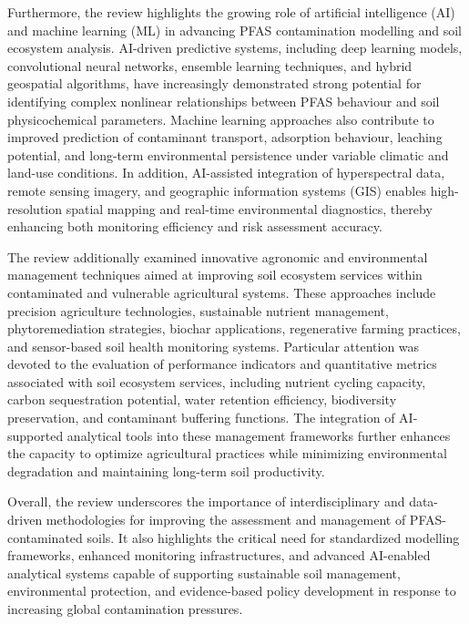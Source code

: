 \documentclass[preprint,12pt]{elsarticle}            %
\begin{document}
Furthermore, the review highlights the growing role of artificial intelligence
(AI) and machine learning (ML) in advancing PFAS contamination modelling and
soil ecosystem analysis. AI-driven predictive systems, including deep learning
models, convolutional neural networks, ensemble learning techniques, and hybrid
geospatial algorithms, have increasingly demonstrated strong potential for
identifying complex nonlinear relationships between PFAS behaviour and soil
physicochemical parameters. Machine learning approaches also contribute to
improved prediction of contaminant transport, adsorption behaviour, leaching
potential, and long-term environmental persistence under variable climatic and
land-use conditions. In addition, AI-assisted integration of hyperspectral
data, remote sensing imagery, and geographic information systems (GIS) enables
high-resolution spatial mapping and real-time environmental diagnostics,
thereby enhancing both monitoring efficiency and risk assessment accuracy.

The review additionally examined innovative agronomic and environmental
management techniques aimed at improving soil ecosystem services within
contaminated and vulnerable agricultural systems. These approaches include
precision agriculture technologies, sustainable nutrient management,
phytoremediation strategies, biochar applications, regenerative farming
practices, and sensor-based soil health monitoring systems. Particular
attention was devoted to the evaluation of performance indicators and
quantitative metrics associated with soil ecosystem services, including
nutrient cycling capacity, carbon sequestration potential, water retention
efficiency, biodiversity preservation, and contaminant buffering functions.
The integration of AI-supported analytical tools into these management
frameworks further enhances the capacity to optimize agricultural practices
while minimizing environmental degradation and maintaining long-term soil
productivity.

Overall, the review underscores the importance of interdisciplinary and
data-driven methodologies for improving the assessment and management of
PFAS-contaminated soils. It also highlights the critical need for standardized
modelling frameworks, enhanced monitoring infrastructures, and advanced
AI-enabled analytical systems capable of supporting sustainable soil
management, environmental protection, and evidence-based policy development in
response to increasing global contamination pressures.

\end{document}
